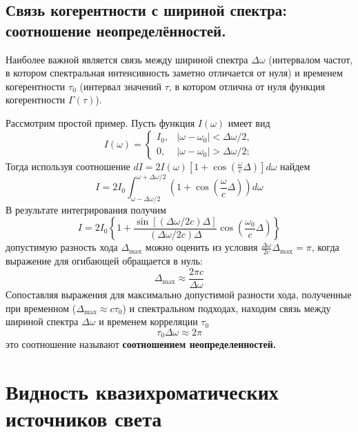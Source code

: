 \documentclass[a4paper, 12pt]{book}
\begin{document}
	\section{Связь когерентности с шириной спектра: соотношение неопределённостей.}
	Наиболее важной является связь между шириной спектра $\Delta\omega$ (интервалом частот, в котором спектральная интенсивность заметно отличается от нуля) и временем когерентности $\tau_0$ (интервал значений $\tau$, в котором отлична от нуля функция когерентности $\Gamma\left(\tau\right)$).\par
	Рассмотрим простой пример. Пусть функция $I\left(\omega\right)$ имеет вид
	\begin{equation*}
		I\left(\omega\right)=\begin{cases}
			I_0, & \left|\omega-\omega_0\right|<\Delta\omega/2,\\
			0, & \left|\omega-\omega_0\right|>\Delta\omega/2;
		\end{cases}
	\end{equation*}
	Тогда используя соотношение $dI=2I\left(\omega\right)\left[1+\cos\left(\frac{\omega}{c}\Delta\right)\right]d\omega$ найдем
	\begin{equation}
		I=2I_0\int^{\omega+\Delta\omega/2}_{\omega-\Delta\omega/2}\left(1+\cos\left(\frac{\omega}{c}\Delta\right)\right)d\omega
	\end{equation}
	В результате интегрирования получим
	\begin{equation}
		I=2I_0\left\{1+\frac{\sin\left[\left(\Delta\omega/2c\right)\Delta\right]}{\left(\Delta\omega/2c\right)\Delta}\cos\left(\frac{\omega_0}{c}\Delta\right)\right\}
	\end{equation}
	допустимую разность хода $\Delta_{\max}$ можно оценить из условия $\frac{\Delta\omega}{2c}\Delta_{\max}=\pi$, когда выражение для огибающей обращается в нуль:
	\begin{equation*}
		\Delta_{\max}\approx\frac{2\pi c}{\Delta\omega}
	\end{equation*}
	Сопоставляя выражения для максимально допустимой разности хода, полученные при временном ($\Delta_{\max}\approx c\tau_0$) и спектральном подходах, находим связь между шириной спектра $\Delta\omega$ и временем корреляции $\tau_0$
	\begin{equation}
		\tau_0\Delta\omega\approx2\pi
	\end{equation}
	это соотношение называют \textbf{соотношением неопределенностей.}
	\chapter{Видность квазихроматических источников света}
\end{document}
